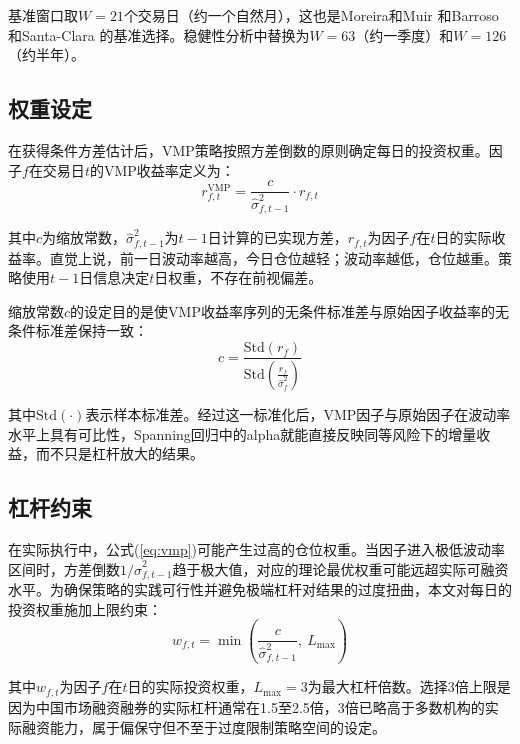 \documentclass[
    decl-page,
    oneside,
  ]{njuthesis}
\begin{document}
基准窗口取$W = 21$个交易日（约一个自然月），这也是Moreira和Muir \cite{moreira2017volatility} 和Barroso和Santa-Clara \cite{barroso2015momentum} 的基准选择。稳健性分析中替换为$W = 63$（约一季度）和$W = 126$（约半年）。

\subsection{权重设定}

在获得条件方差估计后，VMP策略按照方差倒数的原则确定每日的投资权重。因子$f$在交易日$t$的VMP收益率定义为：
\begin{equation}
  r_{f,t}^{\text{VMP}} = \frac{c}{\hat{\sigma}_{f,t-1}^{2}} \cdot r_{f,t}
  \label{eq:vmp}
\end{equation}

其中$c$为缩放常数，$\hat{\sigma}_{f,t-1}^{2}$为$t-1$日计算的已实现方差，$r_{f,t}$为因子$f$在$t$日的实际收益率。直觉上说，前一日波动率越高，今日仓位越轻；波动率越低，仓位越重。策略使用$t-1$日信息决定$t$日权重，不存在前视偏差。

缩放常数$c$的设定目的是使VMP收益率序列的无条件标准差与原始因子收益率的无条件标准差保持一致：
\begin{equation}
  c = \frac{\text{Std}(r_{f})}{\text{Std}\left(\frac{r_{f}}{\hat{\sigma}_{f}^{2}}\right)}
  \label{eq:scaling}
\end{equation}

其中$\text{Std}(\cdot)$表示样本标准差。经过这一标准化后，VMP因子与原始因子在波动率水平上具有可比性，Spanning回归中的alpha就能直接反映同等风险下的增量收益，而不只是杠杆放大的结果。

\subsection{杠杆约束}

在实际执行中，公式(\ref{eq:vmp})可能产生过高的仓位权重。当因子进入极低波动率区间时，方差倒数$1/\hat{\sigma}_{f,t-1}^{2}$趋于极大值，对应的理论最优权重可能远超实际可融资水平。为确保策略的实践可行性并避免极端杠杆对结果的过度扭曲，本文对每日的投资权重施加上限约束：
\begin{equation}
  w_{f,t} = \min\left(\frac{c}{\hat{\sigma}_{f,t-1}^{2}},\ L_{\max}\right)
  \label{eq:leverage}
\end{equation}

其中$w_{f,t}$为因子$f$在$t$日的实际投资权重，$L_{\max} = 3$为最大杠杆倍数。选择3倍上限是因为中国市场融资融券的实际杠杆通常在1.5至2.5倍，3倍已略高于多数机构的实际融资能力，属于偏保守但不至于过度限制策略空间的设定。
\end{document}
